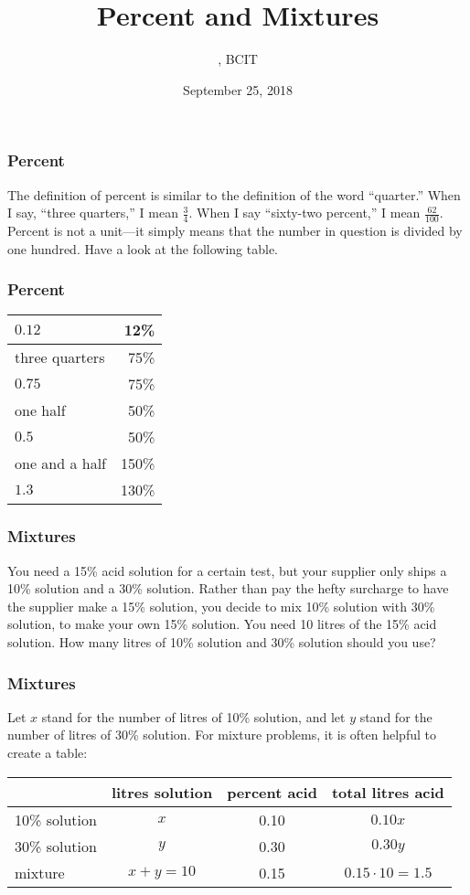 \documentclass[xcolor=dvipsnames]{beamer}
\title{Percent and Mixtures}
\subtitle{{\CourseNumber}, BCIT}
\author{\CourseName}
\date{September 25, 2018}
\begin{document}
\begin{frame}
  \titlepage
\end{frame}

\begin{frame}
  \frametitle{Percent}
The definition of percent is similar to the definition of the word
``quarter.'' When I say, ``three quarters,'' I mean $\frac{3}{4}$.
When I say ``sixty-two percent,'' I mean $\frac{62}{100}$. Percent is
not a unit---it simply means that the number in question is divided by
one hundred. Have a look at the following table.
\end{frame}

\begin{frame}
  \frametitle{Percent}
\begin{tabular}{|l|r|}\hline
  $0.12$ & 12\% \\ \hline
  three quarters & 75\% \\ \hline
  $0.75$ & 75\% \\ \hline
  one half & 50\% \\ \hline
  $0.5$ & 50\% \\ \hline
  one and a half & 150\% \\ \hline
  $1.3$ & 130\% \\ \hline
\end{tabular}
\end{frame}

\begin{frame}
  \frametitle{Mixtures}
  You need a 15\% acid solution for a certain test, but your supplier
  only ships a 10\% solution and a 30\% solution. Rather than pay the
  hefty surcharge to have the supplier make a 15\% solution, you
  decide to mix 10\% solution with 30\% solution, to make your own
  15\% solution. You need 10 litres of the 15\% acid solution. How
  many litres of 10\% solution and 30\% solution should you use?
\end{frame}

\begin{frame}
  \frametitle{Mixtures}
  Let $x$ stand for the number of litres of 10\% solution, and let $y$
  stand for the number of litres of 30\% solution. For mixture
  problems, it is often helpful to create a table:

  \bigskip

  \begin{tabular}{|l|c|c|c|}\hline
    & litres solution & percent acid & total litres acid \\ \hline
    10\% solution & $x$ & 0.10 & $0.10x$ \\ \hline
    30\% solution & $y$ & 0.30 & $0.30y$ \\ \hline
    mixture & $x+y=10$ & 0.15 & $0.15\cdot{}10=1.5$ \\ \hline
  \end{tabular}
\end{frame}
\end{document}
